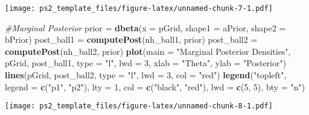 \documentclass[
]{article}
\newenvironment{Shaded}{\begin{snugshade}}{\end{snugshade}}
\newcommand{\AttributeTok}[1]{\textcolor[rgb]{0.13,0.29,0.53}{#1}}
\newcommand{\CommentTok}[1]{\textcolor[rgb]{0.56,0.35,0.01}{\textit{#1}}}
\newcommand{\DecValTok}[1]{\textcolor[rgb]{0.00,0.00,0.81}{#1}}
\newcommand{\FunctionTok}[1]{\textcolor[rgb]{0.13,0.29,0.53}{\textbf{#1}}}
\newcommand{\NormalTok}[1]{#1}
\newcommand{\OtherTok}[1]{\textcolor[rgb]{0.56,0.35,0.01}{#1}}
\newcommand{\StringTok}[1]{\textcolor[rgb]{0.31,0.60,0.02}{#1}}
\begin{document}
\texttt{[image: ps2\_template\_files/figure-latex/unnamed-chunk-7-1.pdf]}

\begin{Shaded}
\begin{Highlighting}[]
\CommentTok{\#Marginal Posterior}
\NormalTok{prior }\OtherTok{=} \FunctionTok{dbeta}\NormalTok{(}\AttributeTok{x =}\NormalTok{ pGrid, }\AttributeTok{shape1 =}\NormalTok{ aPrior, }\AttributeTok{shape2 =}\NormalTok{ bPrior)}
\NormalTok{post\_ball1 }\OtherTok{=} \FunctionTok{computePost}\NormalTok{(nh\_ball1, prior)}
\NormalTok{post\_ball2 }\OtherTok{=} \FunctionTok{computePost}\NormalTok{(nh\_ball2, prior)}
\FunctionTok{plot}\NormalTok{(}\AttributeTok{main =} \StringTok{"Marginal Posterior Densities"}\NormalTok{, pGrid, post\_ball1, }
     \AttributeTok{type =} \StringTok{"l"}\NormalTok{, }\AttributeTok{lwd =} \DecValTok{3}\NormalTok{, }\AttributeTok{xlab =} \StringTok{"Theta"}\NormalTok{, }\AttributeTok{ylab =} \StringTok{"Posterior"}\NormalTok{)}
\FunctionTok{lines}\NormalTok{(pGrid, post\_ball2, }\AttributeTok{type =} \StringTok{"l"}\NormalTok{, }\AttributeTok{lwd =} \DecValTok{3}\NormalTok{, }\AttributeTok{col =} \StringTok{"red"}\NormalTok{)}
\FunctionTok{legend}\NormalTok{(}\StringTok{"topleft"}\NormalTok{, }\AttributeTok{legend =} \FunctionTok{c}\NormalTok{(}\StringTok{"p1"}\NormalTok{, }\StringTok{"p2"}\NormalTok{), }\AttributeTok{lty =} \DecValTok{1}\NormalTok{, }
       \AttributeTok{col =} \FunctionTok{c}\NormalTok{(}\StringTok{"black"}\NormalTok{, }\StringTok{"red"}\NormalTok{), }\AttributeTok{lwd =} \FunctionTok{c}\NormalTok{(}\DecValTok{5}\NormalTok{, }\DecValTok{5}\NormalTok{), }\AttributeTok{bty =} \StringTok{"n"}\NormalTok{)}
\end{Highlighting}
\end{Shaded}

\texttt{[image: ps2\_template\_files/figure-latex/unnamed-chunk-8-1.pdf]}
\end{document}

